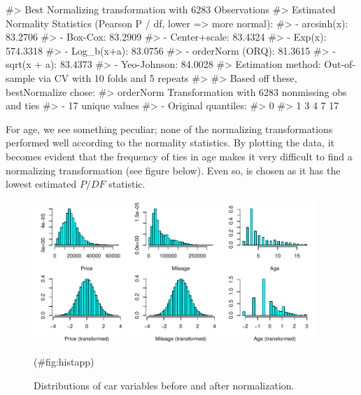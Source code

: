 \begin{Schunk}

\begin{Soutput}
#> Best Normalizing transformation with 6283 Observations
#>  Estimated Normality Statistics (Pearson P / df, lower => more normal):
#>  - arcsinh(x): 83.2706
#>  - Box-Cox: 83.2909
#>  - Center+scale: 83.4324
#>  - Exp(x): 574.3318
#>  - Log_b(x+a): 83.0756
#>  - orderNorm (ORQ): 81.3615
#>  - sqrt(x + a): 83.4373
#>  - Yeo-Johnson: 84.0028
#> Estimation method: Out-of-sample via CV with 10 folds and 5 repeats
#>  
#> Based off these, bestNormalize chose:
#> orderNorm Transformation with 6283 nonmissing obs and ties
#>  - 17 unique values 
#>  - Original quantiles:
#>   0%
#>    1    3    4    7   17
\end{Soutput}
\end{Schunk}

For age, we see something peculiar; none of the normalizing
transformations performed well according to the normality statistics. By
plotting the data, it becomes evident that the frequency of ties in age
makes it very difficult to find a normalizing transformation (see figure
below). Even so,  is chosen as it has the lowest
estimated \(P/DF\) statistic.

\begin{Schunk}
\begin{figure}

{\centering \includegraphics[width=4.2in,height=2.1in]{figs/histapp-1} 

}

\caption[Distributions of car variables before and after normalization]{Distributions of car variables before and after normalization.}(\#fig:histapp)
\end{figure}
\end{Schunk}

